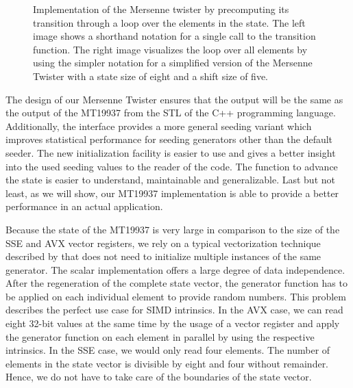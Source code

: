 \documentclass{stdlocal}
\begin{document}
\begin{figure}
\begin{subfigure}[b]{0.73\textwidth}
      \end{subfigure}
      \caption[Mersenne Twister Loop Scheme]{
        Implementation of the Mersenne twister by precomputing its transition through a loop over the elements in the state.
        The left image shows a shorthand notation for a single call to the transition function.
        The right image visualizes the loop over all elements by using the simpler notation for a simplified version of the Mersenne Twister with a state size of eight and a shift size of five.
      }
      \label{fig:mt-loop-scheme}
    \end{figure}

    The design of our Mersenne Twister ensures that the output will be the same as the output of the MT19937 from the STL of the C++ programming language.
    Additionally, the interface provides a more general seeding variant which improves statistical performance for seeding generators other than the default seeder.
    The new initialization facility is easier to use and gives a better {}insight into the used seeding values to the reader of the code.
    The function to advance the state is easier to understand, maintainable and generalizable.
    Last but not least, as we will show, our MT19937 implementation is able to provide a better performance in an actual application.

    Because the state of the MT19937 is very large in comparison to the size of the SSE and AVX vector registers, we rely on a typical vectorization technique described by \textcite{fog2015} that does not need to initialize multiple instances of the same generator.
    The scalar implementation offers a large degree of data independence.
    After the regeneration of the complete state vector, the generator function has to be applied on each individual element to provide random numbers.
    This problem describes the perfect use case for SIMD intrinsics.
    In the AVX case, we can read eight 32-bit values at the same time by the usage of a vector register and apply the generator function on each element in parallel by using the respective intrinsics.
    In the SSE case, we would only read four elements.
    The number of elements in the state vector is divisible by eight and four without remainder.
    Hence, we do not have to take care of the boundaries of the state vector.
\end{document}
